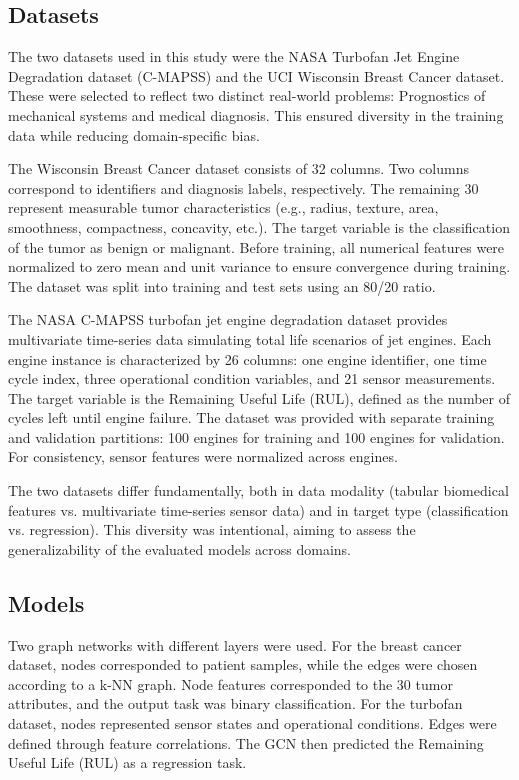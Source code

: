 \documentclass[12pt]{article}
\begin{document}
\subsection{Datasets}
The two datasets used in this study were the NASA Turbofan Jet Engine Degradation dataset (C-MAPSS) and the UCI Wisconsin Breast Cancer dataset. These were selected to reflect two distinct real-world problems: Prognostics of mechanical systems and medical diagnosis. This ensured diversity in the training data while reducing domain-specific bias.

The Wisconsin Breast Cancer dataset consists of 32 columns. Two columns correspond to identifiers and diagnosis labels, respectively.
The remaining 30 represent measurable tumor characteristics (e.g., radius, texture, area, smoothness, compactness, concavity, etc.). The target variable is the classification of the tumor as benign or malignant. Before training, all numerical features were normalized to zero mean and unit variance to ensure convergence during training. The dataset was split into training and test sets using an 80/20 ratio.


The NASA C-MAPSS turbofan jet engine degradation dataset provides multivariate time-series data simulating total life scenarios of jet engines. Each engine instance is characterized by 26 columns: one engine identifier, one time cycle index, three operational condition variables, and 21 sensor measurements. The target variable is the Remaining Useful Life (RUL), defined as the number of cycles left until engine failure.
The dataset was provided with separate training and validation partitions: 100 engines for training and 100 engines for validation. For consistency, sensor features were normalized across engines.


The two datasets differ fundamentally, both in data modality (tabular biomedical features vs. multivariate time-series sensor data) and in target type (classification vs. regression). This diversity was intentional, aiming to assess the generalizability of the evaluated models across domains.


\subsection{Models}
Two graph networks with different layers were used.
For the breast cancer dataset, nodes corresponded to patient samples, while the edges were chosen according to a k-NN graph. Node features corresponded to the 30 tumor attributes, and the output task was binary classification.
For the turbofan dataset, nodes represented sensor states and operational conditions. Edges were defined through feature correlations. The GCN then predicted the Remaining Useful Life (RUL)
as a regression task.
\end{document}
